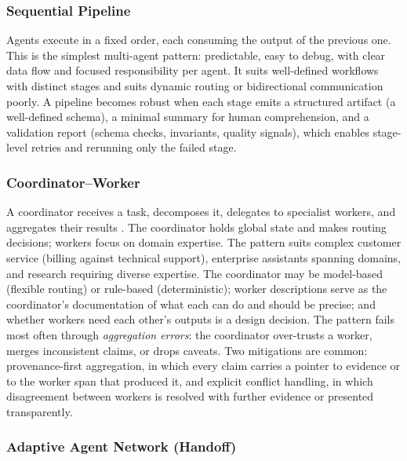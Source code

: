 \documentclass[11pt]{book}
\begin{document}
\subsubsection{Sequential Pipeline}

Agents execute in a fixed order, each consuming the output of the previous one. This is the simplest multi-agent pattern: predictable, easy to debug, with clear data flow and focused responsibility per agent. It suits well-defined workflows with distinct stages and suits dynamic routing or bidirectional communication poorly. A pipeline becomes robust when each stage emits a structured artifact (a well-defined schema), a minimal summary for human comprehension, and a validation report (schema checks, invariants, quality signals), which enables stage-level retries and rerunning only the failed stage.

\subsubsection{Coordinator--Worker}

A coordinator receives a task, decomposes it, delegates to specialist workers, and aggregates their results \cite{googleadk2025}. The coordinator holds global state and makes routing decisions; workers focus on domain expertise. The pattern suits complex customer service (billing against technical support), enterprise assistants spanning domains, and research requiring diverse expertise. The coordinator may be model-based (flexible routing) or rule-based (deterministic); worker descriptions serve as the coordinator's documentation of what each can do and should be precise; and whether workers need each other's outputs is a design decision. The pattern fails most often through \textit{aggregation errors}: the coordinator over-trusts a worker, merges inconsistent claims, or drops caveats. Two mitigations are common: provenance-first aggregation, in which every claim carries a pointer to evidence or to the worker span that produced it, and explicit conflict handling, in which disagreement between workers is resolved with further evidence or presented transparently.

\subsubsection{Adaptive Agent Network (Handoff)}
\end{document}
